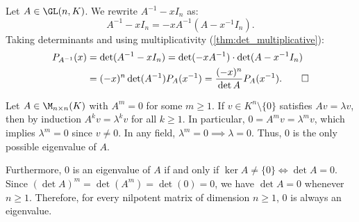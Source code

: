 \begin{exercisesolution}
\label{sol:char_poly_inverse_matrix}
Let $A \in \GL(n, K)$. We rewrite $A^{-1} - x I_n$ as:
\[
A^{-1} - x I_n = -x A^{-1} (A - x^{-1} I_n).
\]
Taking determinants and using multiplicativity (\cref{thm:det_multiplicative}):
\begin{align*}
P_{A^{-1}}(x) &= \det(A^{-1} - x I_n) = \det(-x A^{-1}) \cdot \det(A - x^{-1} I_n) \\
&= (-x)^n \det(A^{-1}) P_A(x^{-1}) = \frac{(-x)^n}{\det A} P_A(x^{-1}). \qedhere
\end{align*}
\end{exercisesolution}

\begin{exercisesolution}
\label{sol:nilpotent_matrix_eigenvalues}
Let $A \in \M_{n \times n}(K)$ with $A^m = 0$ for some $m \ge 1$.
If $v \in K^n \setminus \{0\}$ satisfies $A v = \lambda v$, then by induction $A^k v = \lambda^k v$ for all $k \ge 1$.
In particular, $0 = A^m v = \lambda^m v$, which implies $\lambda^m = 0$ since $v \ne 0$.
In any field, $\lambda^m = 0 \implies \lambda = 0$. Thus, $0$ is the only possible eigenvalue of $A$.

Furthermore, $0$ is an eigenvalue of $A$ if and only if $\ker A \ne \{0\} \iff \det A = 0$.
Since $(\det A)^m = \det(A^m) = \det(0) = 0$, we have $\det A = 0$ whenever $n \ge 1$.
Therefore, for every nilpotent matrix of dimension $n \ge 1$, $0$ is always an eigenvalue.
\end{exercisesolution}

